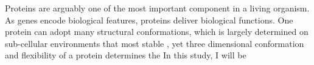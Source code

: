 Proteins are arguably one of the most important component in a living organism. As genes encode biological features, proteins deliver biological functions. One protein can adopt many structural conformations, which is largely determined on sub-cellular environments that most stable , yet three dimensional conformation and flexibility of a protein determines the     In this study, I will be 